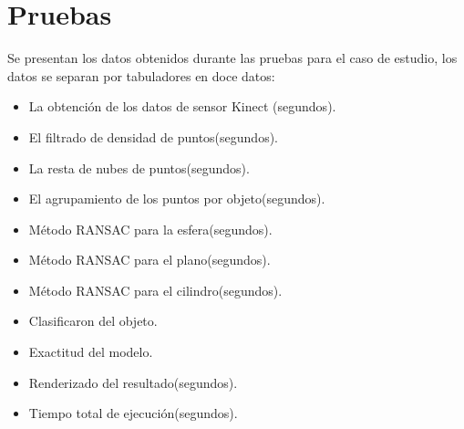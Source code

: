 
\section{Pruebas}\label{A:pruebas}

Se presentan los datos obtenidos durante las pruebas para el caso de estudio, los datos se separan por tabuladores en doce datos:
\begin{itemize}
	\item La obtención de los datos de sensor Kinect (segundos).\\
	\item El filtrado de densidad de puntos(segundos).\\
	\item La resta de nubes de puntos(segundos).\\
	\item El agrupamiento de los puntos por objeto(segundos).\\
	\item Método RANSAC para la esfera(segundos).\\
	\item Método RANSAC para el plano(segundos).\\
	\item Método RANSAC para el cilindro(segundos).\\
	\item Clasificaron del objeto.
	\item Exactitud del modelo.
	\item Renderizado del resultado(segundos).\\
	\item Tiempo total de ejecución(segundos).\\

\end{itemize}


